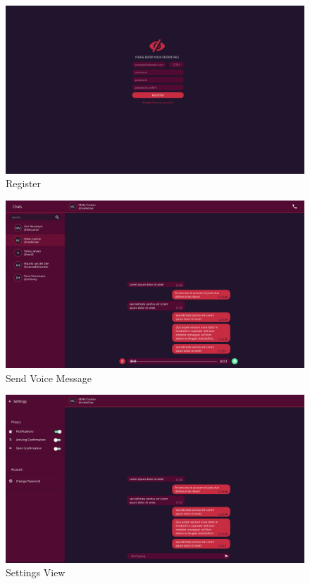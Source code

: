 \begin{figure}[h]
    \centering
    \includegraphics[width=1.0\textwidth]{./graphics/wireframes/Register}
    \caption{Register}
    \label{fig:figure26}
\end{figure}

\begin{figure}[h]
    \centering
    \includegraphics[width=1.0\textwidth]{./graphics/wireframes/SendVoiceMessage}
    \caption{Send Voice Message}
    \label{fig:figure27}
\end{figure}

\begin{figure}[h]
    \centering
    \includegraphics[width=1.0\textwidth]{./graphics/wireframes/SettingsView}
    \caption{Settings View}
    \label{fig:figure28}
\end{figure}


